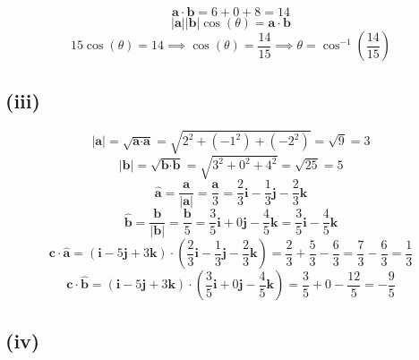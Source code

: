 \documentclass{article}
\begin{document}
\begin{equation*}
    \textbf{a} \cdot \textbf{b} = 6 + 0 + 8 = 14
\end{equation*}
\begin{equation*}
    |\textbf{a}||\textbf{b}| \cos(\theta) = \textbf{a} \cdot \textbf{b}
\end{equation*}
\begin{equation*}
    15 \cos(\theta) = 14 \implies \cos(\theta) = \frac{14}{15} \implies \theta = \cos^{-1}(\frac{14}{15})
\end{equation*}


\subsection*{(iii)}

\begin{equation*}
    |\textbf{a}| = \sqrt{\textbf{a} \cdot \textbf{a}} = \sqrt{2^2 + (-1^2) + (-2^2)} = \sqrt{9} = 3
\end{equation*}
\begin{equation*}
    |\textbf{b}| = \sqrt{\textbf{b} \cdot \textbf{b}} = \sqrt{3^2 + 0^2 + 4^2} = \sqrt{25} = 5
\end{equation*}
\begin{equation*}
    \hat{\textbf{a}} = \frac{\textbf{a}}{|\textbf{a}|} = \frac{\textbf{a}}{3} = \frac{2}{3}\textbf{i} - \frac{1}{3}\textbf{j} - \frac{2}{3}\textbf{k}
\end{equation*}
\begin{equation*}
    \hat{\textbf{b}} = \frac{\textbf{b}}{|\textbf{b}|} = \frac{\textbf{b}}{5} = \frac{3}{5}\textbf{i} + 0\textbf{j} - \frac{4}{5}\textbf{k} = \frac{3}{5}\textbf{i} - \frac{4}{5}\textbf{k}
\end{equation*}
\begin{equation*}
    \textbf{c} \cdot \hat{\textbf{a}} = (\textbf{i} - 5\textbf{j} + 3\textbf{k}) \cdot (\frac{2}{3}\textbf{i} - \frac{1}{3}\textbf{j} - \frac{2}{3}\textbf{k}) = \frac{2}{3} + \frac{5}{3} - \frac{6}{3} = \frac{7}{3} - \frac{6}{3} = \frac{1}{3}
\end{equation*}
\begin{equation*}
    \textbf{c} \cdot \hat{\textbf{b}} = (\textbf{i} - 5\textbf{j} + 3\textbf{k}) \cdot (\frac{3}{5}\textbf{i} + 0\textbf{j} - \frac{4}{5}\textbf{k}) = \frac{3}{5} + 0 - \frac{12}{5} = - \frac{9}{5}
\end{equation*}

\subsection*{(iv)}
\end{document}
